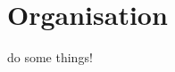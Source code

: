 \documentclass[french]{spimubphdthesis}
\begin{document}
\section{Organisation }

\begin{emphbox}
	do some things!
\end{emphbox}





\end{document}
